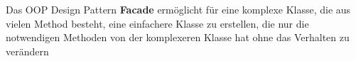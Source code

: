 Das OOP Design Pattern \textbf{Facade} ermöglicht für eine komplexe Klasse, die aus vielen Method besteht, eine einfachere Klasse zu erstellen, 
die nur die notwendigen Methoden von der komplexeren Klasse hat ohne das Verhalten zu verändern